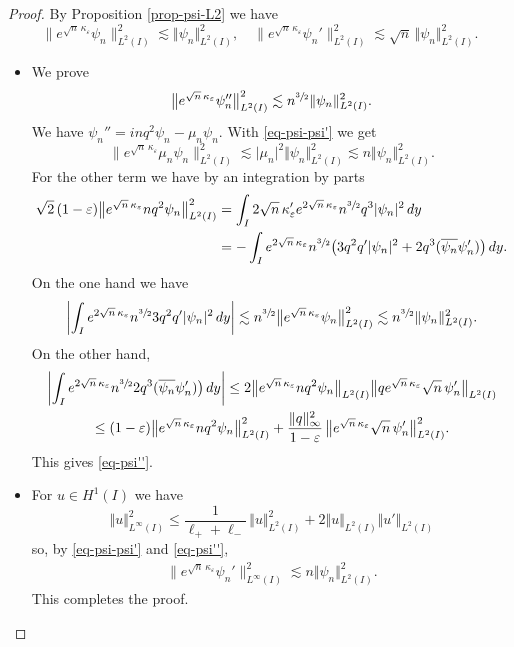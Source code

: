 \documentclass[10pt]{amsart}
\theoremstyle{plain}
\theoremstyle{definition}
\newcommand{\abs}[1]{\vert #1\vert}
\newcommand{\bbabs}[1]{\biggl\vert #1\biggr\vert}
\newcommand{\nr}[1]{\Vert #1\Vert}
\newcommand{\1}{\mathds 1}
\let\Re\relax
\DeclareMathOperator{\Re}{\mathsf{Re}\mkern2mu}
\let\e\varepsilon
\let\k\kappa
\begin{document}
\begin{proof}
By Proposition \ref{prop-psi-L2} we have
\begin{equation} \label{eq-psi-psi'}
\big\|e^{\sqrt n\,\kappa_\e} \psi_n\big\|_{L^2(I)}^2 \lesssim \nr{\psi_n}_{L^2(I)}^2, \quad
\big\|e^{\sqrt n\,\kappa_\e} \psi_n'\big\|_{L^2(I)}^2 \lesssim \sqrt n\,\nr{\psi_n}_{L^2(I)}^2.
\end{equation}

\begin{itemize}
\item
We prove
\begin{equation} \label{eq-psi''}
\big\|e^{\sqrt n\,\kappa_\e} \psi_n''\big\|_{L^2(I)}^2 \lesssim n^{\sfrac 32} \nr{\psi_n}_{L^2(I)}^2.
\end{equation}
We have $\psi_n'' = inq^2 \psi_n - \mu_n \psi_n$. With \eqref{eq-psi-psi'} we get
\[
\big\| e^{\sqrt n\,\kappa_\e} \mu_n \psi_n \big\|_{L^2(I)}^2 \lesssim \abs{\mu_n}^2 \nr{\psi_n}_{L^2(I)}^2 \lesssim n \nr{\psi_n}_{L^2(I)}^2.
\]
For the other term we have by an integration by parts
\begin{align*}
\sqrt 2\, (1-\e) \big\| e^{\sqrt n\,\kappa_\e} n q^2 \psi_n \big\|_{L^2(I)}^2
& = \int_I 2 \sqrt n\,\k_\e' e^{2 \sqrt n\,\kappa_\e} n^{\sfrac 32} q^3 \abs{\psi_n}^2 \, dy\\
& = -\int_I e^{2 \sqrt n\,\kappa_\e} n^{\sfrac 32} \bigl(3 q^2 q' \abs{\psi_n}^2 + 2 q^3 \Re(\overline{\psi_n} \psi_n') \bigr) \, dy.
\end{align*}
On the one hand we have
\[
\bbabs{\int_I e^{2 \sqrt n\,\kappa_\e} n^{\sfrac 32} 3 q^2 q' \abs{\psi_n}^2 \, dy} \lesssim n^{\sfrac 32} \big\| e^{\sqrt n\,\kappa_\e} \psi_n \big\|_{L^2(I)}^2 \lesssim n^{\sfrac 32} \nr{\psi_n}_{L^2(I)}^2.
\]
On the other hand,
\begin{multline*}
\bbabs{\int_I e^{2 \sqrt n\,\kappa_\e} n^{\sfrac 32} 2 q^3 \Re(\overline{\psi_n} \psi_n') \bigr) \, dy} \leq 2 \big\|e^{\sqrt n\,\kappa_\e} n q^2 \psi_n\big\|_{L^2(I)} \big\| q e^{\sqrt n\,\kappa_\e} \sqrt n\,\psi_n'\big\|_{L^2(I)}\\
\leq (1-\e) \big\|e^{\sqrt n\,\kappa_\e} n q^2 \psi_n\big\|_{L^2(I)}^2 + \frac {\nr{q}_\infty^2}{1-\e}\, \big\|e^{\sqrt n\,\kappa_\e} \sqrt n\,\psi_n'\big\|_{L^2(I)}^2.
\end{multline*}
This gives \eqref{eq-psi''}.

\item
For $u \in H^1(I)$ we have
\[
\nr{u}_{L^\infty(I)}^2 \leq \frac{1}{\ell_+ +\ell_-}\, \nr{u}_{L^2(I)}^2 + 2 \nr{u}_{L^2(I)}\nr{u'}_{L^2(I)}
\]
so, by \eqref{eq-psi-psi'} and \eqref{eq-psi''},
\begin{align*}
\big\|e^{\sqrt n\,\kappa_\e} \psi_n'\big\|_{L^\infty(I)}^2
\lesssim n \nr{\psi_n}_{L^2(I)}^2.
\end{align*}
This completes the proof.\qedhere
\end{itemize}
\end{proof}
\end{document}
